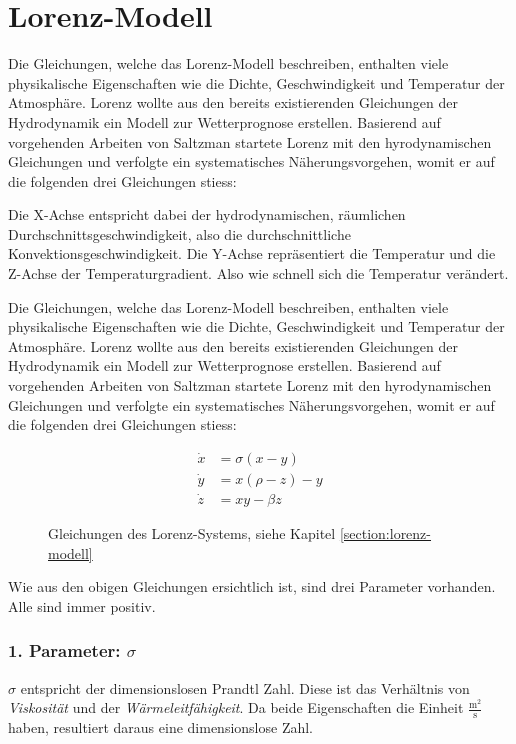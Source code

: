 

\section{Lorenz-Modell}\label{lorenz-modell}
Die Gleichungen, welche das Lorenz-Modell beschreiben, enthalten viele physikalische Eigenschaften wie die Dichte, Geschwindigkeit und Temperatur der Atmosphäre. Lorenz wollte aus den bereits existierenden Gleichungen der Hydrodynamik ein Modell zur Wetterprognose erstellen. Basierend auf vorgehenden Arbeiten von Saltzman \cite{saltzman62} startete Lorenz mit den hyrodynamischen Gleichungen und verfolgte ein systematisches Näherungsvorgehen, womit er auf die folgenden drei Gleichungen stiess:

Die X-Achse entspricht dabei der hydrodynamischen, räumlichen Durchschnittsgeschwindigkeit, also die durchschnittliche Konvektionsgeschwindigkeit. Die Y-Achse repräsentiert die Temperatur und die Z-Achse der Temperaturgradient. Also wie schnell sich die Temperatur verändert.

Die Gleichungen, welche das Lorenz-Modell beschreiben, enthalten viele physikalische Eigenschaften wie die Dichte, Geschwindigkeit und Temperatur der Atmosphäre. Lorenz wollte aus den bereits existierenden Gleichungen der Hydrodynamik ein Modell zur Wetterprognose erstellen. Basierend auf vorgehenden Arbeiten von Saltzman startete Lorenz mit den hyrodynamischen Gleichungen und verfolgte ein systematisches Näherungsvorgehen, womit er auf die folgenden drei Gleichungen stiess:
\begin{figure}
	\begin{align}
		\dot{x} &= \sigma(x - y)\\
		\dot{y} &= x(\rho - z) - y\\
		\dot{z} &= xy - \beta z
	\end{align}
	\caption{Gleichungen des Lorenz-Systems, siehe Kapitel \ref{section:lorenz-modell}}
\end{figure}

Wie aus den obigen Gleichungen ersichtlich ist, sind drei Parameter vorhanden. Alle sind immer positiv.

\subsubsection{1. Parameter: $\sigma$}
$\sigma$ entspricht der dimensionslosen Prandtl Zahl. Diese ist das Verhältnis von \textit{Viskosität} und der \textit{Wärmeleitfähigkeit}. Da beide Eigenschaften die Einheit $\frac{\text{m}^2}{\text{s}}$ haben, resultiert daraus eine dimensionslose Zahl.


